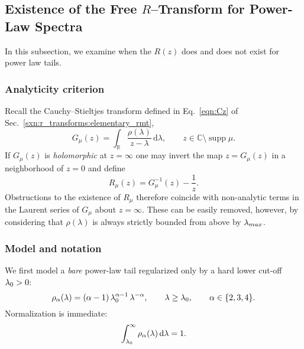 \subsection{Existence of the Free \texorpdfstring{$R$}{R}–Transform for Power-Law Spectra}
\label{sxn:RTransformExists}

In this subsection, we examine when the \RTransform $R(z)$ does and does not exist
for power law tails.

\subsubsection{Analyticity criterion}
\label{sxn:RTransformExists:criterion}

Recall the Cauchy–Stieltjes transform defined in Eq.~\eqref{eqn:Cz} of
Sec.~\ref{sxn:r_transforms:elementary_rmt},
\begin{equation}
\label{eqn:RTransformExists_Gdef}
G_\mu(z)=\int_{\mathbb R}\frac{\rho(\lambda)}{z-\lambda}\,
         \mathrm d\lambda,
\qquad
z\in\mathbb C\setminus\operatorname{supp}\mu .
\end{equation}
If $G_\mu(z)$ is \emph{holomorphic} at $z=\infty$ one may invert the map
$z=G_\mu(z)$ in a neighborhood of $z=0$ and define
\begin{equation}
\label{eqn:RTransformExists_Rdef}
R_\mu(z)=G_\mu^{-1}(z)-\frac{1}{z}.
\end{equation}
Obstructions to the existence of $R_\mu$ therefore coincide with
non-analytic terms in the Laurent series of $G_\mu$ about $z=\infty$.
These can be easily removed, however, by considering that $\rho(\lambda)$ is always strictly bounded from above by $\lambda_{max}$. 
\subsubsection{Model and notation}
\label{sxn:RTransformExists:model}

We first model a \emph{bare} power-law tail regularized only by a hard
lower cut-off $\lambda_{0}>0$:
\begin{equation}
\label{eqn:RTransformExists_density_bare}
\rho_{\alpha}(\lambda)=
(\alpha-1)\,\lambda_{0}^{\alpha-1}\,
\lambda^{-\alpha},
\qquad
\lambda\ge\lambda_{0},
\qquad
\alpha\in\{2,3,4\}.
\end{equation}
Normalization is immediate:
\begin{equation}
\label{eqn:RTransformExists_norm}
\int_{\lambda_{0}}^{\infty}\rho_{\alpha}(\lambda)\,
      \mathrm d\lambda = 1.
\end{equation}

